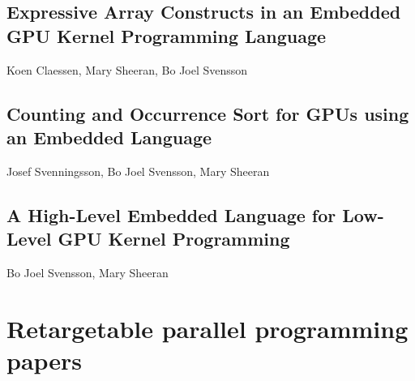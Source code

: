 \documentclass[a4paper]{book}
\newcommand{\paperEXPRESSIVE}{Expressive Array Constructs in an Embedded GPU Kernel Programming Language}
\newcommand{\paperCSORT}{Counting and Occurrence Sort for GPUs using an Embedded Language}
\newcommand{\paperHL}{A High-Level Embedded Language for Low-Level GPU Kernel Programming}
\begin{document}
\section{\paperEXPRESSIVE}
\label{sec:paperEXPRESSIVE}

\begin{center} 
Koen Claessen, Mary Sheeran, Bo Joel Svensson
\end{center}



% 
\cleardoublepage 

\section{\paperCSORT}
\label{sec:paperCSORT}

\begin{center} 
Josef Svenningsson, Bo Joel Svensson, Mary Sheeran 
\end{center}





% 
\cleardoublepage 


\section{\paperHL}
\label{sec:paperHL}

\begin{center} 
Bo Joel Svensson, Mary Sheeran
\end{center}






% 

\chapter{Retargetable parallel programming papers}
\label{chap:ArBB}
% 
\cleardoublepage 
\end{document}
